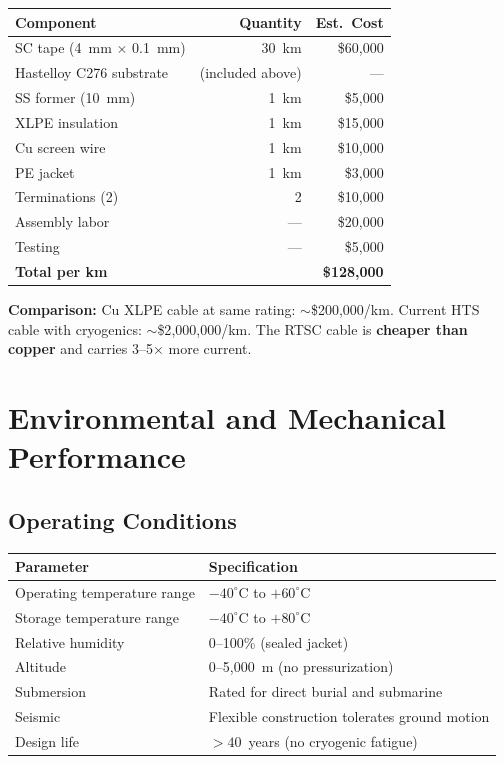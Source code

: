 \documentclass[11pt, a4paper]{article}
\begin{document}
\begin{center}
\begin{tabular}{@{}lrr@{}}
\toprule
\textbf{Component} & \textbf{Quantity} & \textbf{Est.\ Cost} \\
\midrule
SC tape (4~mm $\times$ 0.1~mm) & 30~km & \$60{,}000 \\
Hastelloy C276 substrate & (included above) & --- \\
SS former (10~mm) & 1~km & \$5{,}000 \\
XLPE insulation & 1~km & \$15{,}000 \\
Cu screen wire & 1~km & \$10{,}000 \\
PE jacket & 1~km & \$3{,}000 \\
Terminations (2) & 2 & \$10{,}000 \\
Assembly labor & --- & \$20{,}000 \\
Testing & --- & \$5{,}000 \\
\midrule
\textbf{Total per km} & & \textbf{\$128{,}000} \\
\bottomrule
\end{tabular}
\end{center}

\textbf{Comparison:} Cu XLPE cable at same rating: $\sim$\$200{,}000/km.
Current HTS cable with cryogenics: $\sim$\$2{,}000{,}000/km.
The RTSC cable is \textbf{cheaper than copper} and carries
3--5$\times$ more current.

\section{Environmental and Mechanical Performance}
\label{sec:performance}

\subsection{Operating Conditions}

\begin{center}
\begin{tabular}{@{}ll@{}}
\toprule
\textbf{Parameter} & \textbf{Specification} \\
\midrule
Operating temperature range & $-40^\circ$C to $+60^\circ$C \\
Storage temperature range & $-40^\circ$C to $+80^\circ$C \\
Relative humidity & 0--100\% (sealed jacket) \\
Altitude & 0--5{,}000~m (no pressurization) \\
Submersion & Rated for direct burial and submarine \\
Seismic & Flexible construction tolerates ground motion \\
Design life & $> 40$~years (no cryogenic fatigue) \\
\bottomrule
\end{tabular}
\end{center}
\end{document}

